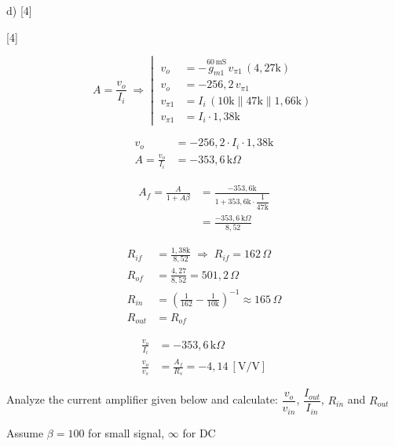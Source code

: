 \documentclass[11pt,a4paper]{article}
\begin{document}
d)
[4]

[4]

\[ A = \frac{v_o}{I_i} \;\Rightarrow\; \left|\;\begin{aligned}
  v_o &= -\overset{\scriptstyle 60\,\mathrm{mS}}{g_{m1}}\,v_{\pi1}\,(4{,}27\mathrm{k}) \\
  v_o &= -256{,}2\,v_{\pi1} \\
  v_{\pi1} &= I_i\,(10\mathrm{k}\parallel 47\mathrm{k}\parallel 1{,}66\mathrm{k}) \\
  v_{\pi1} &= I_i\cdot 1{,}38\mathrm{k}
\end{aligned}\right. \]

\begin{align*}
  v_o &= -256{,}2 \cdot I_i \cdot 1{,}38\mathrm{k} \\
  A = \frac{v_o}{I_i} &= -353{,}6\,\mathrm{k}\Omega
\end{align*}


\begin{align*}
  A_f = \frac{A}{1+A\beta} &= \frac{-353{,}6\mathrm{k}}{1 + 353{,}6\mathrm{k}\cdot\dfrac{1}{47\mathrm{k}}} \\
  &= \frac{-353{,}6\,\mathrm{k}\Omega}{8{,}52}
\end{align*}


\begin{align*}
  R_{if} &= \frac{1{,}38\mathrm{k}}{8{,}52} \;\Rightarrow\; R_{if} = 162\,\Omega \\
  R_{of} &= \frac{4{,}27}{8{,}52} = 501{,}2\,\Omega \\
  R_{in} &= \left(\frac{1}{162} - \frac{1}{10\mathrm{k}}\right)^{-1} \approx 165\,\Omega \\
  R_{out} &= R_{of}
\end{align*}

\begin{align*}
  \frac{v_o}{I_i} &= -353{,}6\,\mathrm{k}\Omega \\
  \frac{v_o}{v_s} &= \frac{A_f}{R_s} = -4{,}14\ [\mathrm{V/V}]
\end{align*}

\begin{ornek}
  Analyze the current amplifier given below and calculate: $\dfrac{v_o}{v_{in}}$, $\dfrac{I_{out}}{I_{in}}$, $R_{in}$ and $R_{out}$

  Assume $\beta=100$ for small signal, $\infty$ for DC
\end{ornek}
\end{document}
